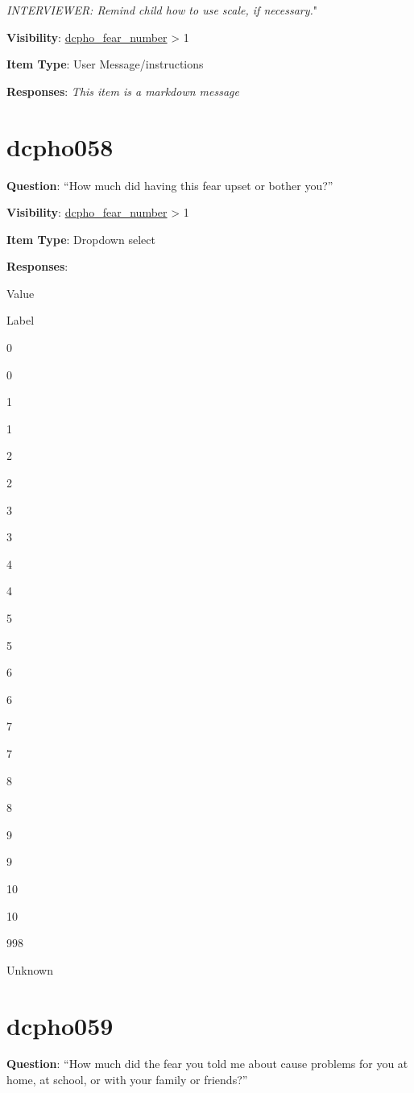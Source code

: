 \documentclass[]{book}
\begin{document}
\emph{INTERVIEWER: Remind child how to use scale, if necessary.}"

\textbf{Visibility}: \protect\hyperlink{dcpho_fear_number}{dcpho\_fear\_number} \textgreater{} 1

\textbf{Item Type}: User Message/instructions

\textbf{Responses}: \emph{This item is a markdown message}

\hypertarget{dcpho058}{%
\section{dcpho058}\label{dcpho058}}

\textbf{Question}: ``How much did having this fear upset or bother you?''

\textbf{Visibility}: \protect\hyperlink{dcpho_fear_number}{dcpho\_fear\_number} \textgreater{} 1

\textbf{Item Type}: Dropdown select

\textbf{Responses}:

Value

Label

0

0

1

1

2

2

3

3

4

4

5

5

6

6

7

7

8

8

9

9

10

10

998

Unknown

\hypertarget{dcpho059}{%
\section{dcpho059}\label{dcpho059}}

\textbf{Question}: ``How much did the fear you told me about cause problems for you at home, at school, or with your family or friends?''
\end{document}
